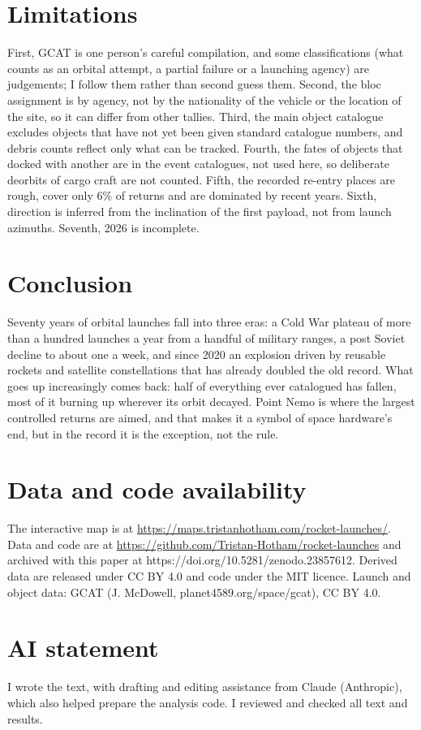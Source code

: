 \documentclass[11pt,a4paper]{article}
\begin{document}
\section{Limitations}
First, GCAT is one person's careful compilation, and some classifications (what counts as an orbital attempt, a partial failure or a launching agency) are judgements; I follow them rather than second guess them. Second, the bloc assignment is by agency, not by the nationality of the vehicle or the location of the site, so it can differ from other tallies. Third, the main object catalogue excludes objects that have not yet been given standard catalogue numbers, and debris counts reflect only what can be tracked. Fourth, the fates of objects that docked with another are in the event catalogues, not used here, so deliberate deorbits of cargo craft are not counted. Fifth, the recorded re-entry places are rough, cover only 6\% of returns and are dominated by recent years. Sixth, direction is inferred from the inclination of the first payload, not from launch azimuths. Seventh, 2026 is incomplete.

\section{Conclusion}
Seventy years of orbital launches fall into three eras: a Cold War plateau of more than a hundred launches a year from a handful of military ranges, a post Soviet decline to about one a week, and since 2020 an explosion driven by reusable rockets and satellite constellations that has already doubled the old record. What goes up increasingly comes back: half of everything ever catalogued has fallen, most of it burning up wherever its orbit decayed. Point Nemo is where the largest controlled returns are aimed, and that makes it a symbol of space hardware's end, but in the record it is the exception, not the rule.

\section*{Data and code availability}
The interactive map is at \url{https://maps.tristanhotham.com/rocket-launches/}. Data and code are at \url{https://github.com/Tristan-Hotham/rocket-launches} and archived with this paper at https://doi.org/10.5281/zenodo.23857612. Derived data are released under CC BY 4.0 and code under the MIT licence. Launch and object data: GCAT (J. McDowell, planet4589.org/space/gcat), CC BY 4.0.

\section*{AI statement}
I wrote the text, with drafting and editing assistance from Claude (Anthropic), which also helped prepare the analysis code. I reviewed and checked all text and results.
\end{document}

